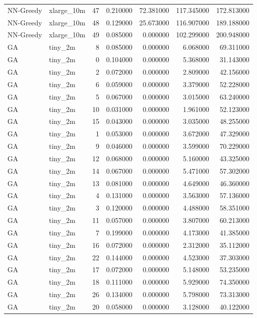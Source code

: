 \begin{tabular}{llrrrrr}
NN-Greedy & xlarge_10m & 47 & 0.210000 & 72.381000 & 117.345000 & 172.813000 \\
NN-Greedy & xlarge_10m & 48 & 0.129000 & 25.673000 & 116.907000 & 189.188000 \\
NN-Greedy & xlarge_10m & 49 & 0.085000 & 0.000000 & 102.299000 & 200.948000 \\
GA & tiny_2m & 8 & 0.085000 & 0.000000 & 6.068000 & 69.311000 \\
GA & tiny_2m & 0 & 0.104000 & 0.000000 & 5.368000 & 31.143000 \\
GA & tiny_2m & 2 & 0.072000 & 0.000000 & 2.809000 & 42.156000 \\
GA & tiny_2m & 6 & 0.059000 & 0.000000 & 3.379000 & 52.228000 \\
GA & tiny_2m & 5 & 0.067000 & 0.000000 & 3.015000 & 63.240000 \\
GA & tiny_2m & 10 & 0.031000 & 0.000000 & 1.961000 & 52.123000 \\
GA & tiny_2m & 15 & 0.043000 & 0.000000 & 3.035000 & 48.255000 \\
GA & tiny_2m & 1 & 0.053000 & 0.000000 & 3.672000 & 47.329000 \\
GA & tiny_2m & 9 & 0.046000 & 0.000000 & 3.599000 & 70.229000 \\
GA & tiny_2m & 12 & 0.068000 & 0.000000 & 5.160000 & 43.325000 \\
GA & tiny_2m & 14 & 0.067000 & 0.000000 & 5.471000 & 57.302000 \\
GA & tiny_2m & 13 & 0.081000 & 0.000000 & 4.649000 & 46.360000 \\
GA & tiny_2m & 4 & 0.131000 & 0.000000 & 3.563000 & 57.136000 \\
GA & tiny_2m & 3 & 0.120000 & 0.000000 & 4.488000 & 58.351000 \\
GA & tiny_2m & 11 & 0.057000 & 0.000000 & 3.807000 & 60.213000 \\
GA & tiny_2m & 7 & 0.199000 & 0.000000 & 4.173000 & 41.385000 \\
GA & tiny_2m & 16 & 0.072000 & 0.000000 & 2.312000 & 35.112000 \\
GA & tiny_2m & 22 & 0.144000 & 0.000000 & 4.523000 & 37.303000 \\
GA & tiny_2m & 17 & 0.072000 & 0.000000 & 5.148000 & 53.235000 \\
GA & tiny_2m & 18 & 0.111000 & 0.000000 & 5.929000 & 74.350000 \\
GA & tiny_2m & 26 & 0.134000 & 0.000000 & 5.798000 & 73.313000 \\
GA & tiny_2m & 20 & 0.058000 & 0.000000 & 3.128000 & 40.122000 \\

\end{tabular}
